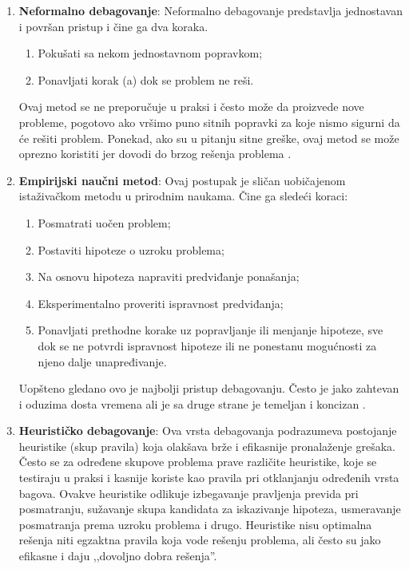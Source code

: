 \documentclass[a4paper]{article}
\begin{document}
\begin{enumerate}
	\item \textbf{Neformalno debagovanje}: Neformalno debagovanje predstavlja jednostavan i površan pristup i čine ga dva koraka.
	\begin{enumerate}
		\item Pokušati sa nekom jednostavnom popravkom;
		\item Ponavljati korak (a) dok se problem ne reši.
	\end{enumerate}
	Ovaj metod se ne preporučuje u praksi i često može da proizvede nove
        probleme, pogotovo ako vršimo puno sitnih popravki za koje nismo sigurni
        da će rešiti problem. Ponekad, ako su u pitanju sitne greške, ovaj metod
        se može oprezno koristiti jer dovodi do brzog rešenja problema \cite{bagovi_smalkov}.
	
	\item \textbf{Empirijski naučni metod}:
	Ovaj postupak je sličan uobičajenom istaživačkom metodu u prirodnim naukama.
	Čine ga sledeći koraci:
	\begin{enumerate}
		\item Posmatrati uočen problem;
		\item Postaviti hipoteze o uzroku problema;
		\item Na osnovu hipoteza napraviti predviđanje ponašanja;
		\item Eksperimentalno proveriti ispravnost predviđanja;
		\item Ponavljati prethodne korake uz popravljanje ili menjanje hipoteze, sve dok se ne potvrdi ispravnost hipoteze ili ne ponestanu mogućnosti za njeno dalje unapređivanje.
	\end{enumerate}
	\indent Uopšteno gledano ovo je najbolji pristup debagovanju. Često je
        jako zahtevan i oduzima dosta vremena ali je sa druge strane je temeljan
        i koncizan \cite{bagovi_smalkov}.
	
	
	\item \textbf{Heurističko debagovanje}:
	Ova vrsta debagovanja podrazumeva postojanje heuristike (skup pravila)
        koja olakšava brže i efikasnije pronalaženje grešaka. Često se za
        određene skupove problema prave različite heuristike, koje se testiraju
        u praksi i kasnije koriste kao pravila pri otklanjanju određenih vrsta
        bagova. Ovakve heuristike odlikuje izbegavanje pravljenja previda pri
        posmatranju, sužavanje skupa kandidata za iskazivanje hipoteza,
        usmeravanje posmatranja prema uzroku problema i drugo. Heuristike nisu
        optimalna rešenja niti egzaktna pravila koja vode rešenju problema, ali
        često su jako efikasne i daju ,,dovoljno dobra rešenja''\cite{bagovi_smalkov}.
\end{enumerate}
\end{document}
